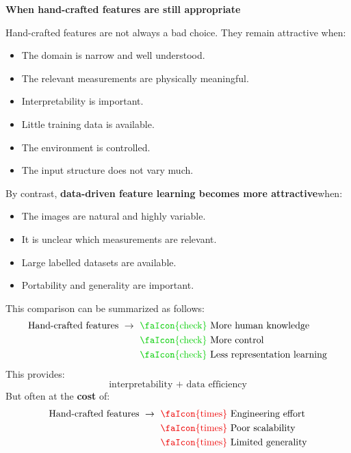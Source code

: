 \begin{flushleft}
    \textcolor{Green3}{ \textbf{When hand-crafted features are still appropriate}}
\end{flushleft}
Hand-crafted features are not always a bad choice. They remain attractive when:
\begin{itemize}
    \item[\textcolor{Green3}{\faIcon{check}}] The domain is narrow and well understood.
    \item[\textcolor{Green3}{\faIcon{check}}] The relevant measurements are physically meaningful.
    \item[\textcolor{Green3}{\faIcon{check}}] Interpretability is important.
    \item[\textcolor{Green3}{\faIcon{check}}] Little training data is available.
    \item[\textcolor{Green3}{\faIcon{check}}] The environment is controlled.
    \item[\textcolor{Green3}{\faIcon{check}}] The input structure does not vary much.
\end{itemize}
By contrast, \textbf{data-driven feature learning becomes more attractive}\break when:
\begin{itemize}
    \item The images are natural and highly variable.
    \item It is unclear which measurements are relevant.
    \item Large labelled datasets are available.
    \item Portability and generality are important.
\end{itemize}
This comparison can be summarized as follows:
\begin{align*}
    \text{Hand-crafted features } \to \text{ } & \text{\textcolor{Green3}{\faIcon{check}}} \text{ More human knowledge} \\
    & \text{\textcolor{Green3}{\faIcon{check}}} \text{ More control} \\
    & \text{\textcolor{Green3}{\faIcon{check}}} \text{ Less representation learning}
\end{align*}
This provides:
\begin{equation*}
    \text{interpretability } + \text{ data efficiency}
\end{equation*}
But often at the \textbf{cost} of:
\begin{align*}
    \text{Hand-crafted features } \to \text{ } & \text{\textcolor{Red2}{\faIcon{times}}} \text{ Engineering effort} \\
    & \text{\textcolor{Red2}{\faIcon{times}}} \text{ Poor scalability} \\
    & \text{\textcolor{Red2}{\faIcon{times}}} \text{ Limited generality}
\end{align*}
